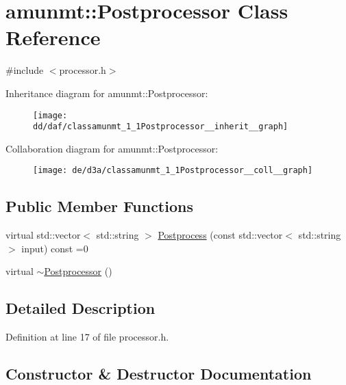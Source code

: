 \hypertarget{classamunmt_1_1Postprocessor}{}\section{amunmt\+:\+:Postprocessor Class Reference}
\label{classamunmt_1_1Postprocessor}


{\ttfamily \#include $<$processor.\+h$>$}



Inheritance diagram for amunmt\+:\+:Postprocessor\+:
\nopagebreak
\begin{figure}[H]
\begin{center}
\leavevmode
\texttt{[image: dd/daf/classamunmt\_1\_1Postprocessor\_\_inherit\_\_graph]}
\end{center}
\end{figure}


Collaboration diagram for amunmt\+:\+:Postprocessor\+:
\nopagebreak
\begin{figure}[H]
\begin{center}
\leavevmode
\texttt{[image: de/d3a/classamunmt\_1\_1Postprocessor\_\_coll\_\_graph]}
\end{center}
\end{figure}
\subsection*{Public Member Functions}
\begin{DoxyCompactItemize}
\item 
virtual std\+::vector$<$ std\+::string $>$ \hyperlink{classamunmt_1_1Postprocessor_acf21db55b198bed6440f8f45e200ca24}{Postprocess} (const std\+::vector$<$ std\+::string $>$ input) const =0
\item 
virtual \hyperlink{classamunmt_1_1Postprocessor_ad8123fd2cfb347ba4d9728be539f92f2}{$\sim$\+Postprocessor} ()
\end{DoxyCompactItemize}


\subsection{Detailed Description}


Definition at line 17 of file processor.\+h.



\subsection{Constructor \& Destructor Documentation}
